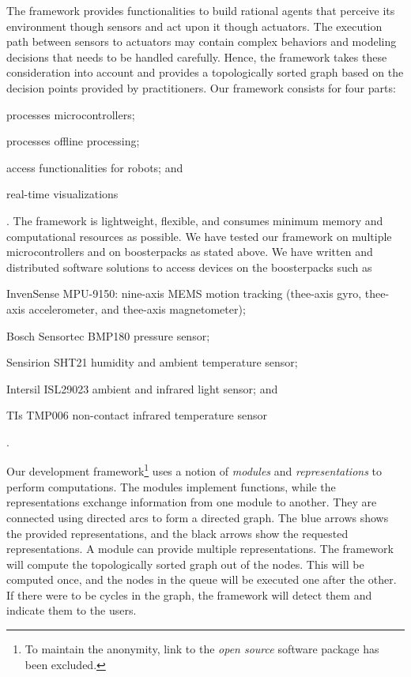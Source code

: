 \documentclass[letterpaper]{article}
\begin{document}
\begin{sloppy}
The framework provides functionalities to 
build  rational agents that perceive its environment though sensors and act upon it though 
actuators. The execution path between sensors to actuators may contain complex behaviors and 
modeling decisions that needs to be handled carefully. Hence, the framework takes these 
consideration into account and provides a topologically sorted graph based on the decision points 
provided by practitioners. Our framework consists for four parts: \begin{inparaenum}[(1)]\item 
processes microcontrollers; \item processes offline processing; \item access functionalities for  
robots; and \item real-time visualizations\end{inparaenum}. The 
framework is lightweight, flexible, and consumes minimum memory and computational resources as 
possible. We have tested our framework on multiple microcontrollers and on boosterpacks as stated 
above. We have written and distributed  software solutions to access devices on the boosterpacks 
such 
as \begin{inparaenum}[(1)] \item InvenSense MPU-9150: nine-axis MEMS motion tracking (thee-axis 
gyro, thee-axis accelerometer, and thee-axis magnetometer); \item Bosch Sensortec BMP180 pressure 
sensor; \item Sensirion SHT21 humidity and ambient temperature sensor; \item Intersil ISL29023 
ambient and infrared light sensor; and \item TIs TMP006 non-contact infrared temperature 
sensor\end{inparaenum}.


Our development framework\footnote{To maintain the anonymity, link to the {\em open source} 
software package has been excluded.} uses a 
notion of 
{\em modules} and {\em representations} to perform
computations. The modules implement functions, while the representations exchange information from
one module to another. They are connected using directed arcs to form a directed graph. The blue 
arrows shows the provided representations, 
and the black arrows show the requested representations. A module can provide multiple 
representations. The framework will compute the topologically sorted graph out of 
the nodes. This will be computed once, and the nodes in the queue will be executed one after the 
other. If there were to be cycles in the graph, the framework will detect them and indicate them to 
the users. 


\end{sloppy}
\end{document}
